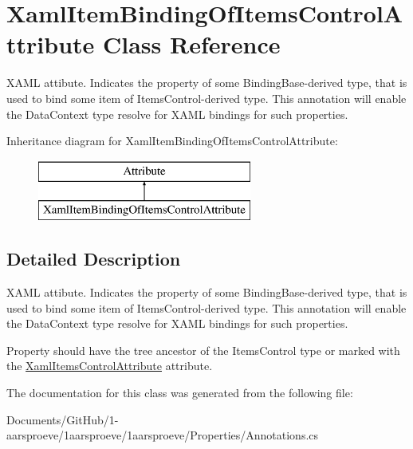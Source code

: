 \hypertarget{class_xaml_item_binding_of_items_control_attribute}{}\section{Xaml\+Item\+Binding\+Of\+Items\+Control\+Attribute Class Reference}
\label{class_xaml_item_binding_of_items_control_attribute}


X\+A\+M\+L attibute. Indicates the property of some {\ttfamily Binding\+Base}-\/derived type, that is used to bind some item of {\ttfamily Items\+Control}-\/derived type. This annotation will enable the {\ttfamily Data\+Context} type resolve for X\+A\+M\+L bindings for such properties.  


Inheritance diagram for Xaml\+Item\+Binding\+Of\+Items\+Control\+Attribute\+:\begin{figure}[H]
\begin{center}
\leavevmode
\includegraphics[height=2.000000cm]{class_xaml_item_binding_of_items_control_attribute}
\end{center}
\end{figure}


\subsection{Detailed Description}
X\+A\+M\+L attibute. Indicates the property of some {\ttfamily Binding\+Base}-\/derived type, that is used to bind some item of {\ttfamily Items\+Control}-\/derived type. This annotation will enable the {\ttfamily Data\+Context} type resolve for X\+A\+M\+L bindings for such properties. 

Property should have the tree ancestor of the {\ttfamily Items\+Control} type or marked with the \hyperlink{class_xaml_items_control_attribute}{Xaml\+Items\+Control\+Attribute} attribute. 

The documentation for this class was generated from the following file\+:\begin{DoxyCompactItemize}
\item 
Documents/\+Git\+Hub/1-\/aarsproeve/1aarsproeve/1aarsproeve/\+Properties/Annotations.\+cs\end{DoxyCompactItemize}

